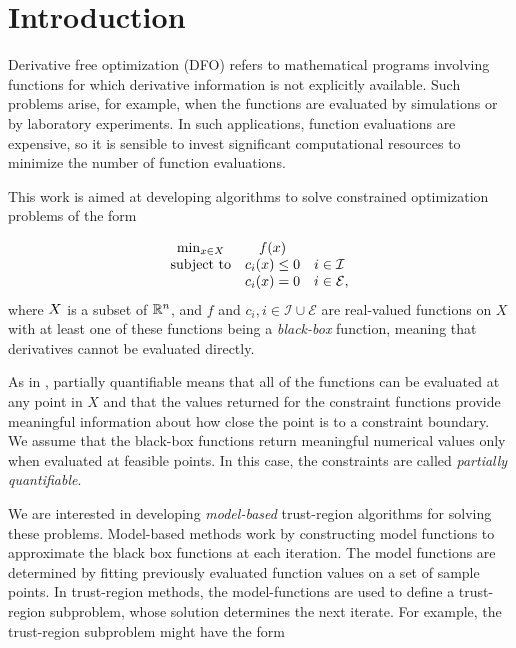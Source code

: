 
\section{Introduction}

Derivative free optimization (DFO) refers to mathematical programs involving functions for which derivative information is not explicitly available.
Such problems arise, for example, when the functions are evaluated by simulations or by laboratory experiments.
In such applications, function evaluations are expensive, so it is sensible to invest significant computational resources to minimize the number of function evaluations.

This work is aimed at developing algorithms to solve constrained optimization problems of the form 

\[ \begin{array}{ccl} \min_{x \in X} & f(x) \\
\mbox{subject to} & c_i(x) \le 0 & i \in \mathcal{I} \\
& c_i(x) = 0 & i \in \mathcal{E},
\end{array}
\]
where $X$ is a subset of $\mathbb R^n$, and $f$ and $c_i, i \in \mathcal{I} \cup \mathcal{E}$ are real-valued functions on $X$ with at least one of these functions being a {\em black-box} function, meaning that derivatives cannot be evaluated directly.

As in \cite{DUMMY:typesofconstraints}, partially quantifiable means that all of the functions can be evaluated at any point in $X$ and that the values returned for the constraint functions provide meaningful information about how close the point is to a constraint boundary.
We assume that the black-box functions return meaningful numerical values only when evaluated at feasible points. In this case, the constraints are called {\em partially quantifiable}.   

We are interested in developing {\em model-based} trust-region algorithms for solving these problems.
Model-based methods work by constructing model functions to approximate the black box functions at each iteration.
The model functions are determined by fitting previously evaluated function values on a set of sample points.
In trust-region methods, the model-functions are used to define a trust-region subproblem, whose solution determines the next iterate.
For example, the trust-region subproblem might have the form

